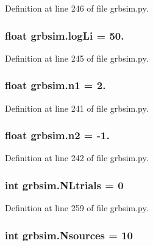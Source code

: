 Definition at line 246 of file grbsim.\-py.

\hypertarget{namespacegrbsim_a943574d69a85e735365eff8cf657ccc7}{
\subsubsection[{log\-Li}]{\setlength{\rightskip}{0pt plus 5cm}float grbsim.\-log\-Li = 50.}}\label{namespacegrbsim_a943574d69a85e735365eff8cf657ccc7}


Definition at line 245 of file grbsim.\-py.

\hypertarget{namespacegrbsim_a871af59fd84dd91b02e9d2af01051d57}{
\subsubsection[{n1}]{\setlength{\rightskip}{0pt plus 5cm}float grbsim.\-n1 = 2.}}\label{namespacegrbsim_a871af59fd84dd91b02e9d2af01051d57}


Definition at line 241 of file grbsim.\-py.

\hypertarget{namespacegrbsim_a8bf076e9bb69f278884b158093fa55c3}{
\subsubsection[{n2}]{\setlength{\rightskip}{0pt plus 5cm}float grbsim.\-n2 = -\/1.}}\label{namespacegrbsim_a8bf076e9bb69f278884b158093fa55c3}


Definition at line 242 of file grbsim.\-py.

\hypertarget{namespacegrbsim_af3a00b7a4b776e0f905fee9cd3412130}{
\subsubsection[{N\-Ltrials}]{\setlength{\rightskip}{0pt plus 5cm}int grbsim.\-N\-Ltrials = 0}}\label{namespacegrbsim_af3a00b7a4b776e0f905fee9cd3412130}


Definition at line 259 of file grbsim.\-py.

\hypertarget{namespacegrbsim_af7ec521c0ad959b19ac7a6629547f3c7}{
\subsubsection[{Nsources}]{\setlength{\rightskip}{0pt plus 5cm}int grbsim.\-Nsources = 10}}\label{namespacegrbsim_af7ec521c0ad959b19ac7a6629547f3c7}


